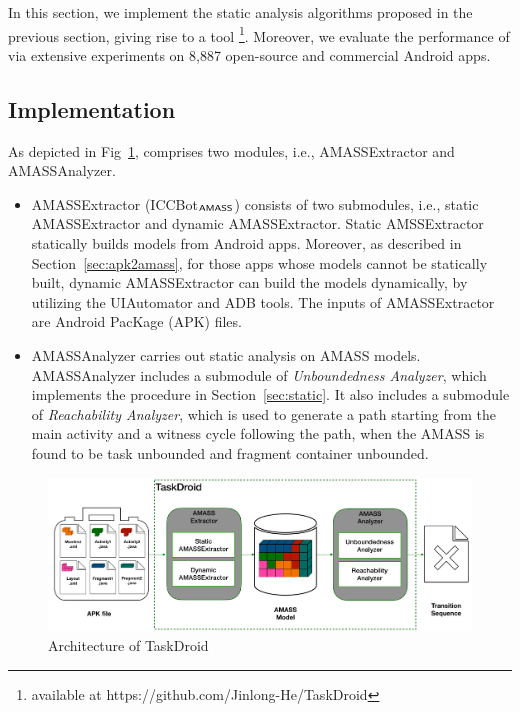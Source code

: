 
In this section,  we implement the static analysis algorithms proposed in the previous section, giving rise to %
a tool {\tool}\footnote{available at https://github.com/Jinlong-He/TaskDroid}. Moreover, we evaluate the performance of {\tool} via extensive experiments 
on 8,887 open-source and commercial Android apps.  

\subsection{Implementation}\label{sec:impl}

As depicted in Fig~\ref{fig:taskdroid}, {\tool} comprises two modules, i.e., {\sf AMASSExtractor} and {\sf AMASSAnalyzer}. 

\begin{itemize}
\item {\sf AMASSExtractor} (ICCBot$_{\textsf{AMASS}}$) consists of two submodules, i.e., static {\sf AMASSExtractor} and dynamic {\sf AMASSExtractor}. Static {\sf AMSSExtractor} statically builds {\AMASS} models from Android apps. Moreover, as described in Section~\ref{sec:apk2amass}, for those apps whose {\AMASS} models cannot be statically built, dynamic {\sf AMASSExtractor} can build the {\AMASS} models dynamically, by utilizing the UIAutomator and ADB tools. The inputs of {\sf AMASSExtractor} are Android PacKage (APK)  files.
%
\item {\sf AMASSAnalyzer}  carries out static analysis on AMASS models. {\sf AMASSAnalyzer} includes a submodule of \emph{Unboundedness Analyzer},  which implements the procedure in Section~\ref{sec:static}. It also includes a submodule of \emph{Reachability Analyzer}, which is used to generate a path starting from the main activity and a witness cycle following the path, when the AMASS is found to be task unbounded and fragment container unbounded.
\end{itemize}

\begin{figure}[htbp]
	\centering
	\includegraphics[scale=0.23]{taskdroid.pdf}
	\caption{Architecture of TaskDroid}
	\label{fig:taskdroid}
\end{figure}

